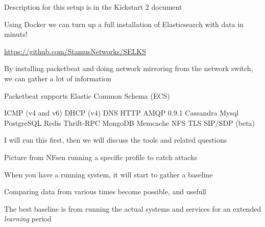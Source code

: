 \documentclass[Screen16to9,17pt]{foils}
\begin{document}


\begin{list2}
\item Description for this setup is in the Kickstart 2 document
\item Using Docker we can turn up a full installation of Elasticsearch with data in minuts!
\item \url{https://github.com/StamusNetworks/SELKS}
\end{list2}





\begin{list2}
\item By installing packetbeat and doing network mirroring from the network switch, we can gather a lot of information
\item Packetbeat supports Elastic Common Schema (ECS) 
\item ICMP (v4 and v6)
DHCP (v4)
DNS
HTTP
AMQP 0.9.1
Cassandra
Mysql
PostgreSQL
Redis
Thrift-RPC
MongoDB
Memcache
NFS
TLS
SIP/SDP (beta)
\end{list2}




{\Large I will run this first, then we will discuss the tools and related questions}



\begin{list2}
\item Picture from NFsen running a specific profile to catch attacks
\item When you have a running system, it will start to gather a baseline
\item Comparing data from various times become possible, and usefull
\item The best baseline is from running the actual systems and services for an extended \emph{learning} period
\end{list2}


\end{document}
